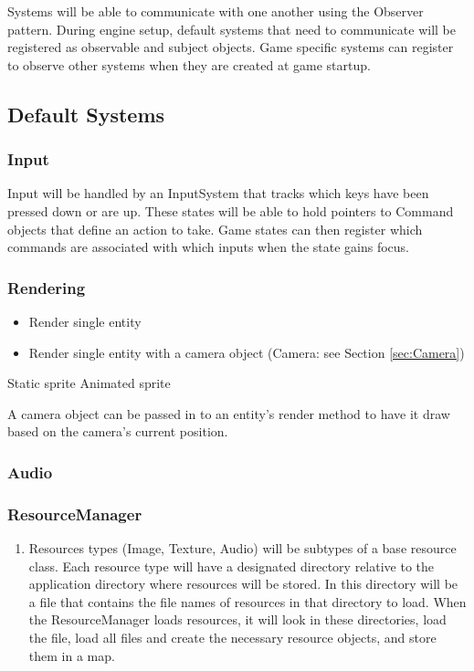 \documentclass[12pt]{article}
\begin{document}
Systems will be able to communicate with one another using the Observer pattern.  During engine setup, default systems that need to communicate will be registered as observable and subject objects.  Game specific systems can register to observe other systems when they are created at game startup.

\subsection{Default Systems}
\subsubsection{	Input }
Input will be handled by an InputSystem that tracks which keys have been pressed down or are up.  These states will be able to hold pointers to Command objects that define an action to take.  Game states can then register which commands are associated with which inputs when the state gains focus.
 

\subsubsection{	Rendering }

	\begin{itemize}
		\item Render single entity
		\item Render single entity with a camera object (Camera: see Section \ref{sec:Camera})
	\end{itemize}
	
Static sprite 
Animated sprite 

A camera object can be passed in to an entity's render method to have it draw based on the camera's current position.

\subsubsection{	Audio}

\subsubsection{ResourceManager}
\begin{enumerate}
	\item Resources types (Image, Texture, Audio) will be subtypes of a base resource class.  Each resource type will have a designated directory relative to the application directory where resources will be stored.  In this directory will be a file that contains the file names of resources in that directory to load.  When the ResourceManager loads resources, it will look in these directories, load the file, load all files and create the necessary resource objects, and store them in a map.  
\end{enumerate}
\end{document}

